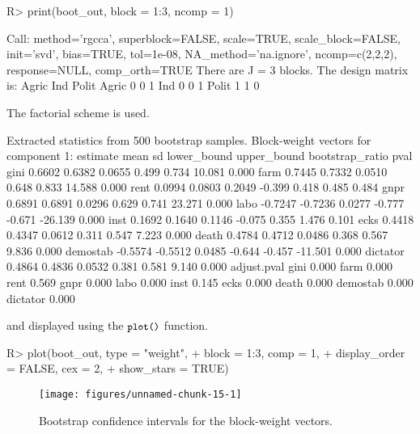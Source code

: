\documentclass[
]{jss}
\begin{document}
\begin{CodeChunk}
\begin{CodeInput}
R> print(boot_out, block = 1:3, ncomp = 1)
\end{CodeInput}
\begin{CodeOutput}
Call: method='rgcca', superblock=FALSE, scale=TRUE, scale_block=FALSE, init='svd',
bias=TRUE, tol=1e-08, NA_method='na.ignore', ncomp=c(2,2,2), response=NULL,
comp_orth=TRUE 
There are J = 3 blocks.
The design matrix is:
      Agric Ind Polit
Agric     0   0     1
Ind       0   0     1
Polit     1   1     0

The factorial scheme is used.

Extracted statistics from 500 bootstrap samples.
Block-weight vectors for component 1: 
         estimate    mean     sd lower_bound upper_bound bootstrap_ratio  pval
gini       0.6602  0.6382 0.0655       0.499       0.734          10.081 0.000
farm       0.7445  0.7332 0.0510       0.648       0.833          14.588 0.000
rent       0.0994  0.0803 0.2049      -0.399       0.418           0.485 0.484
gnpr       0.6891  0.6891 0.0296       0.629       0.741          23.271 0.000
labo      -0.7247 -0.7236 0.0277      -0.777      -0.671         -26.139 0.000
inst       0.1692  0.1640 0.1146      -0.075       0.355           1.476 0.101
ecks       0.4418  0.4347 0.0612       0.311       0.547           7.223 0.000
death      0.4784  0.4712 0.0486       0.368       0.567           9.836 0.000
demostab  -0.5574 -0.5512 0.0485      -0.644      -0.457         -11.501 0.000
dictator   0.4864  0.4836 0.0532       0.381       0.581           9.140 0.000
         adjust.pval
gini           0.000
farm           0.000
rent           0.569
gnpr           0.000
labo           0.000
inst           0.145
ecks           0.000
death          0.000
demostab       0.000
dictator       0.000
\end{CodeOutput}
\end{CodeChunk}

\normalsize

and displayed using the \(\small{\texttt{plot()}}\) function.

\footnotesize

\begin{CodeChunk}
\begin{CodeInput}
R> plot(boot_out, type = "weight", 
+      block = 1:3, comp = 1, 
+      display_order = FALSE, cex = 2,
+      show_stars = TRUE)
\end{CodeInput}
\begin{figure}[H]

{\centering \texttt{[image: figures/unnamed-chunk-15-1]} 

}

\caption[Bootstrap confidence intervals for the block-weight vectors]{Bootstrap confidence intervals for the block-weight vectors.}\label{fig:unnamed-chunk-15}
\end{figure}
\end{CodeChunk}
\end{document}
